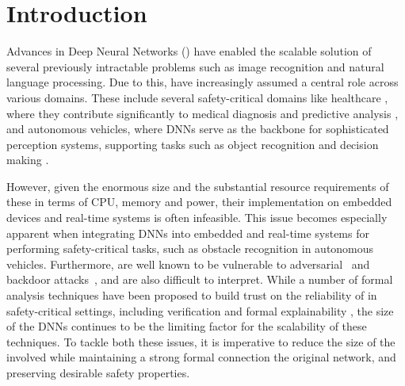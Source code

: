 
\section{Introduction}

Advances in Deep Neural Networks (\dnn) have enabled the scalable solution of
several previously intractable problems such as image recognition and natural
language processing. Due to this, \dnn have increasingly assumed a central role
across various domains. These include several safety-critical domains like
healthcare \cite{b1}, where they contribute significantly to medical
diagnosis and predictive analysis \cite{b2}, and autonomous vehicles, where
DNNs serve as the backbone for sophisticated perception systems, supporting
tasks such as object recognition and decision making \cite{b3}. 


However, given the enormous size and the substantial resource requirements
of these \dnn in terms of CPU, memory and power, their implementation
on embedded devices and real-time systems is often infeasible.
This issue becomes especially apparent when integrating DNNs into embedded and
real-time systems for performing safety-critical tasks, such as obstacle
recognition in autonomous vehicles. 
Furthermore, \dnn are well known to be vulnerable to
adversarial~\cite{l-bfgs,fgsm,deep-fool,pgd,ground-truth-adv-attack,cw-attack}
and backdoor
attacks~\cite{backdoor-poisoning}, and are also difficult to interpret.
While a number of formal analysis techniques have been proposed to build
trust on the reliability of \dnn in safety-critical settings, including
verification \cite{reluplex,deeppoly,crown,beta-crown,cegar-nn}  and formal
explainability \cite{overview-fxai,minimal-image-fxai}, the size of the DNNs
continues to be the limiting factor for the scalability of these techniques.
To tackle both these issues, it is imperative to reduce the size of the \dnn
involved while maintaining a strong formal connection the original network, and
preserving desirable safety properties.

